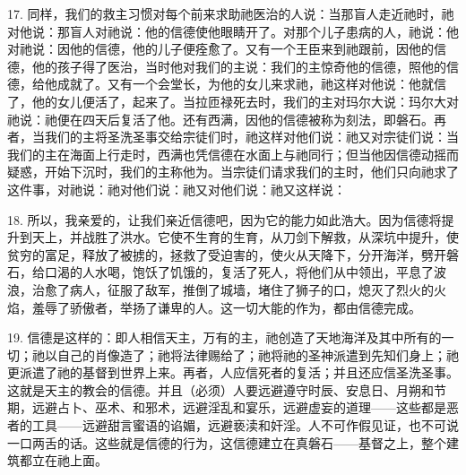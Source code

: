 17. 同样，我们的救主习惯对每个前来求助祂医治的人说：当那盲人走近祂时，祂对他说：那盲人对祂说：他的信德使他眼睛开了。对那个儿子患病的人，祂说：他对祂说：因他的信德，他的儿子便痊愈了。又有一个王臣来到祂跟前，因他的信德，他的孩子得了医治，当时他对我们的主说：我们的主惊奇他的信德，照他的信德，给他成就了。又有一个会堂长，为他的女儿来求祂，祂这样对他说：他就信了，他的女儿便活了，起来了。当拉匝禄死去时，我们的主对玛尔大说：玛尔大对祂说：祂便在四天后复活了他。还有西满，因他的信德被称为刻法，即磐石。再者，当我们的主将圣洗圣事交给宗徒们时，祂这样对他们说：祂又对宗徒们说：当我们的主在海面上行走时，西满也凭信德在水面上与祂同行；但当他因信德动摇而疑惑，开始下沉时，我们的主称他为。当宗徒们请求我们的主时，他们只向祂求了这件事，对祂说：祂对他们说：祂又对他们说：祂又这样说：\par

18. 所以，我亲爱的，让我们亲近信德吧，因为它的能力如此浩大。因为信德将提升到天上，并战胜了洪水。它使不生育的生育，从刀剑下解救，从深坑中提升，使贫穷的富足，释放了被掳的，拯救了受迫害的，使火从天降下，分开海洋，劈开磐石，给口渴的人水喝，饱饫了饥饿的，复活了死人，将他们从中领出，平息了波浪，治愈了病人，征服了敌军，推倒了城墙，堵住了狮子的口，熄灭了烈火的火焰，羞辱了骄傲者，举扬了谦卑的人。这一切大能的作为，都由信德完成。\par

19. 信德是这样的：即人相信天主，万有的主，祂创造了天地海洋及其中所有的一切；祂以自己的肖像造了；祂将法律赐给了；祂将祂的圣神派遣到先知们身上；祂更派遣了祂的基督到世界上来。再者，人应信死者的复活；并且还应信圣洗圣事。这就是天主的教会的信德。并且（必须）人要远避遵守时辰、安息日、月朔和节期，远避占卜、巫术、和邪术，远避淫乱和宴乐，远避虚妄的道理——这些都是恶者的工具——远避甜言蜜语的谄媚，远避亵渎和奸淫。人不可作假见证，也不可说一口两舌的话。这些就是信德的行为，这信德建立在真磐石——基督之上，整个建筑都立在祂上面。\par

